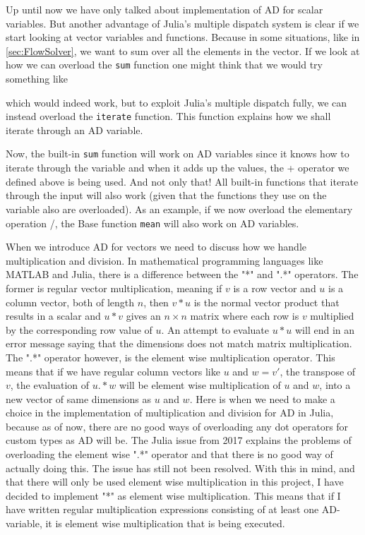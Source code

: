 Up until now we have only talked about implementation of AD for scalar variables. But another advantage of Julia's multiple dispatch system is clear if we start looking at vector variables and functions. Because in some situations, like in \autoref{sec:FlowSolver}, we want to sum over all the elements in the vector. If we look at how we can overload the \texttt{sum} function one might think that we would try something like

which would indeed work, but to exploit Julia's multiple dispatch fully, we can instead overload the \texttt{iterate} function. This function explains how we shall iterate through an AD variable. 

Now, the built-in \texttt{sum} function will work on AD variables since it knows how to iterate through the variable and when it adds up the values, the + operator we defined above is being used. And not only that! All built-in functions that iterate through the input will also work (given that the functions they use on the variable also are overloaded). As an example, if we now overload the elementary operation /, the Base function \texttt{mean} will also work on AD variables.

When we introduce AD for vectors we need to discuss how we handle multiplication and division. In mathematical programming languages like MATLAB and Julia, there is a difference between the "*" and ".*" operators. The former is regular vector multiplication, meaning if $v$ is a row vector and $u$ is a column vector, both of length $n$, then $v*u$ is the normal vector product that results in a scalar and $u*v$ gives an $n\times n$ matrix where each row is $v$ multiplied by the corresponding row value of $u$. An attempt to evaluate $u*u$ will end in an error message saying that the dimensions does not match matrix multiplication. The ".*" operator however, is the element wise multiplication operator. This means that if we have regular column vectors like $u$ and $w = v'$, the transpose of $v$, the evaluation of $u.*w$ will be element wise multiplication of $u$ and $w$, into a new vector of same dimensions as $u$ and $w$. Here is when we need to make a choice in the implementation of multiplication and division for AD in Julia, because as of now, there are no good ways of overloading any dot operators for custom types as AD will be. The Julia issue \emph{\citep{JuliaIssueDot}} from 2017 explains the problems of overloading the element wise ".*" operator and that there is no good way of actually doing this. The issue has still not been resolved. With this in mind, and that there will only be used element wise multiplication in this project, I have decided to implement "*" as element wise multiplication. This means that if I have written regular multiplication expressions consisting of at least one AD-variable, it is element wise multiplication that is being executed.

